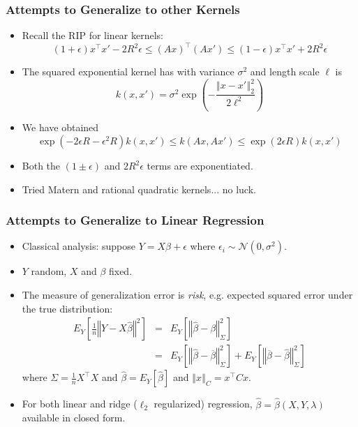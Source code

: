 \documentclass[aspectratio=34]{beamer}
\theoremstyle{plain}
\begin{document}
\begin{frame}
    \frametitle{Attempts to Generalize to other Kernels}
    \begin{itemize}
        \item Recall the RIP for linear kernels:
        \[
        (1+\epsilon)x^{\top}x'-2R^{2}\epsilon\leq\left(Ax\right)^{\top}\left(Ax'\right)\leq(1-\epsilon)x^{\top}x'+2R^{2}\epsilon
        \]
        \item The squared exponential kernel has with variance $\sigma^{2}$ and length scale $\ell$ is
        \begin{equation}
        k(x,x')=\sigma^{2}\exp\left(-\frac{\left\Vert x-x'\right\Vert _{2}^{2}}{2\ell^{2}}\right)\label{eq:kSE}
        \end{equation}
        \item We have obtained
        \begin{equation}
        \exp(-2\epsilon R-\epsilon^{2}R)k(x,x')\leq k(Ax,Ax')\leq\exp(2\epsilon R)k(x,x')\label{eq:exp-bound}
        \end{equation}
        \item Both the $(1\pm\epsilon)$ and $2R^2\epsilon$ terms are exponentiated.
        \item Tried Matern and rational quadratic kernels... no luck.
    \end{itemize}
\end{frame}

\begin{frame}
    \frametitle{Attempts to Generalize to Linear Regression}
    \begin{itemize}
        \item Classical analysis: suppose $Y = X\beta + \epsilon$ where $\epsilon_i \sim \mathcal{N}(0, \sigma^2)$.
        \item $Y$ random, $X$ and $\beta$ fixed.
        \item The measure of generalization error is \emph{risk}, e.g. expected squared error under the true distribution:
        \begin{eqnarray*}
        E_{Y}\left[\frac{1}{n}\left\Vert Y-X\widehat{\beta}\right\Vert ^{2}\right] & = & E_{Y}\left[\left\Vert \widehat{\beta}-\beta\right\Vert _{\Sigma}^{2}\right]\\
         & = & E_{Y}\left[\left\Vert \widehat{\beta}-\overline{\beta}\right\Vert _{\Sigma}^{2}\right] + E_{Y}\left[\left\Vert \overline{\beta}-\widehat{\beta}\right\Vert _{\Sigma}^{2}\right]
        \end{eqnarray*}
        where $\Sigma = \frac{1}{n} X^\top X$ and $\widehat{\beta} = E_Y[\widehat{\beta}]$ and $\left\Vert x \right\Vert_C = x^\top C x$.
        \item For both linear and ridge ($\ell_2$ regularized) regression, $\widehat{\beta} = \widehat{\beta}(X, Y, \lambda)$  available in closed form.
    \end{itemize}
\end{frame}
\end{document}
